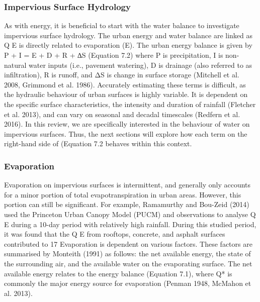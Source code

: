 \documentclass[final,3p,times,authoryear]{elsarticle}
\begin{document}
\subsubsection{Impervious Surface Hydrology}\label{sec:appendix7.1.3}
As with energy, it is beneficial to start with the water balance to investigate impervious
surface hydrology. The urban energy and water balance are linked as Q E is directly
related to evaporation (E). The urban energy balance is given by
P + I = E + D + R + ∆S
(Equation 7.2)
where P is precipitation, I is non-natural water inputs (i.e., pavement watering), D is
drainage (also referred to as infiltration), R is runoff, and ΔS is change in surface storage
(Mitchell et al. 2008, Grimmond et al. 1986).
Accurately estimating these terms is difficult, as the hydraulic behaviour of urban
surfaces is highly variable. It is dependent on the specific surface characteristics, the intensity and duration of rainfall (Fletcher et al. 2013), and can vary on seasonal and
decadal timescales (Redfern et al. 2016).
In this review, we are specifically interested in the behaviour of water on impervious
surfaces. Thus, the next sections will explore how each term on the right-hand side of
(Equation 7.2 behaves within this context.

\subsubsection{Evaporation}\label{sec:appendix7.1.3.1}


Evaporation on impervious surfaces is intermittent, and generally only accounts for a
minor portion of total evapotranspiration in urban areas. However, this portion can still
be significant. For example, Ramamurthy and Bou-Zeid (2014) used the Princeton
Urban Canopy Model (PUCM) and observations to analyse Q E during a 10-day period
with relatively high rainfall. During this studied period, it was found that the Q E from
rooftops, concrete, and asphalt surfaces contributed to 17%
Evaporation is dependent on various factors. These factors are summarised by Monteith
(1991) as follows: the net available energy, the state of the surrounding air, and the
available water on the evaporating surface.
The net available energy relates to the energy balance (Equation 7.1), where Q* is
commonly the major energy source for evaporation (Penman 1948, McMahon et al.
2013).
\end{document}
